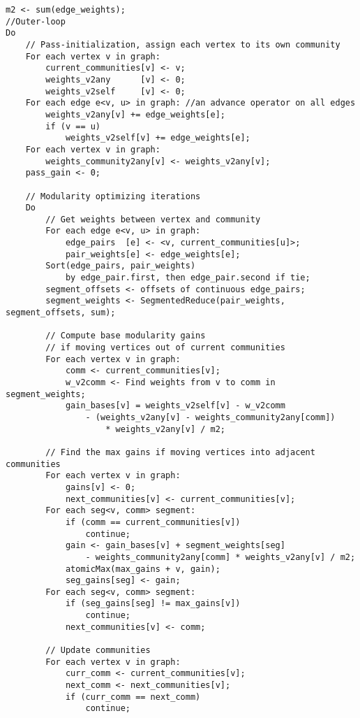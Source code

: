 \documentclass[10pt,oneside]{memoir}
\begin{document}
\begin{verbatim}
m2 <- sum(edge_weights);
//Outer-loop
Do
    // Pass-initialization, assign each vertex to its own community
    For each vertex v in graph:
        current_communities[v] <- v;
        weights_v2any      [v] <- 0;
        weights_v2self     [v] <- 0;
    For each edge e<v, u> in graph: //an advance operator on all edges
        weights_v2any[v] += edge_weights[e];
        if (v == u)
            weights_v2self[v] += edge_weights[e];
    For each vertex v in graph:
        weights_community2any[v] <- weights_v2any[v];
    pass_gain <- 0;

    // Modularity optimizing iterations
    Do
        // Get weights between vertex and community
        For each edge e<v, u> in graph:
            edge_pairs  [e] <- <v, current_communities[u]>;
            pair_weights[e] <- edge_weights[e];
        Sort(edge_pairs, pair_weights)
            by edge_pair.first, then edge_pair.second if tie;
        segment_offsets <- offsets of continuous edge_pairs;
        segment_weights <- SegmentedReduce(pair_weights, segment_offsets, sum);

        // Compute base modularity gains
        // if moving vertices out of current communities
        For each vertex v in graph:
            comm <- current_communities[v];
            w_v2comm <- Find weights from v to comm in segment_weights;
            gain_bases[v] = weights_v2self[v] - w_v2comm
                - (weights_v2any[v] - weights_community2any[comm])
                    * weights_v2any[v] / m2;

        // Find the max gains if moving vertices into adjacent communities
        For each vertex v in graph:
            gains[v] <- 0;
            next_communities[v] <- current_communities[v];
        For each seg<v, comm> segment:
            if (comm == current_communities[v])
                continue;
            gain <- gain_bases[v] + segment_weights[seg]
                - weights_community2any[comm] * weights_v2any[v] / m2;
            atomicMax(max_gains + v, gain);
            seg_gains[seg] <- gain;
        For each seg<v, comm> segment:
            if (seg_gains[seg] != max_gains[v])
                continue;
            next_communities[v] <- comm;

        // Update communities
        For each vertex v in graph:
            curr_comm <- current_communities[v];
            next_comm <- next_communities[v];
            if (curr_comm == next_comm)
                continue;


\end{verbatim}
\end{document}
